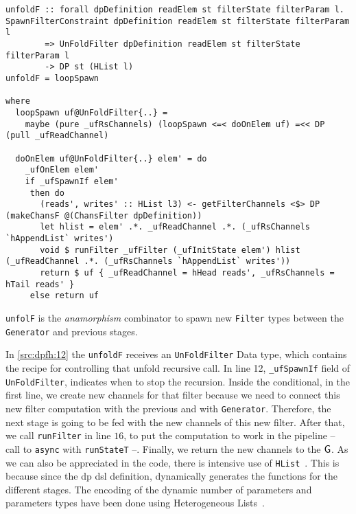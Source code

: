 \begin{listing}[htp!]
  \begin{verbatim}
unfoldF :: forall dpDefinition readElem st filterState filterParam l. SpawnFilterConstraint dpDefinition readElem st filterState filterParam l
        => UnFoldFilter dpDefinition readElem st filterState filterParam l 
        -> DP st (HList l) 
unfoldF = loopSpawn

where
  loopSpawn uf@UnFoldFilter{..} =
    maybe (pure _ufRsChannels) (loopSpawn <=< doOnElem uf) =<< DP (pull _ufReadChannel)

  doOnElem uf@UnFoldFilter{..} elem' = do
    _ufOnElem elem'
    if _ufSpawnIf elem'
     then do
       (reads', writes' :: HList l3) <- getFilterChannels <$> DP (makeChansF @(ChansFilter dpDefinition))
       let hlist = elem' .*. _ufReadChannel .*. (_ufRsChannels `hAppendList` writes')
       void $ runFilter _ufFilter (_ufInitState elem') hlist (_ufReadChannel .*. (_ufRsChannels `hAppendList` writes'))
       return $ uf { _ufReadChannel = hHead reads', _ufRsChannels = hTail reads' }
     else return uf

  \end{verbatim}
  \caption[{[\texttt{Stage.hs}] unfoldF}]{\texttt{unfolF} is the \emph{anamorphism} combinator to spawn new \texttt{Filter} types between the \texttt{Generator} and previous stages.}
  \label{src:dpfh:12}
\end{listing}

In \autoref{src:dpfh:12} the \texttt{unfoldF} receives an \texttt{UnFoldFilter} Data type, which contains the recipe for controlling that unfold recursive call. 
In line 12, \texttt{_ufSpawnIf} field of \texttt{UnFoldFilter}, indicates when to stop the recursion. 
Inside the conditional, in the first line, we create new channels for that filter because we need to connect this new filter computation with the previous and with \texttt{Generator}. 
Therefore, the next stage is going to be fed with the new channels of this new filter. After that, we call \texttt{runFilter} in line $16$, to put the computation 
to work in the pipeline -- call to \texttt{async} with \texttt{runStateT} --. Finally, we return the new channels to the $\mathsf{G}$.
As we can also be appreciated in the code, there is intensive use of \texttt{HList}~\cite{hlist}. This is because since the \acrshort{dp}
\acrshort{dsl} definition, dynamically generates the functions for the different stages. The encoding of the dynamic number of parameters and parameters types have been done using Heterogeneous Lists~\cite{hlist}.

